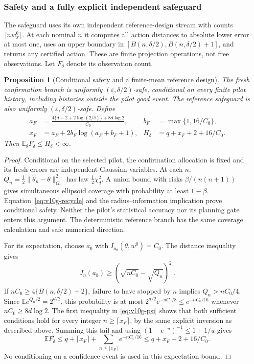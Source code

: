 \documentclass{article}
\theoremstyle{plain}
\newtheorem{proposition}[theorem]{Proposition}
\theoremstyle{definition}
\begin{document}
\subsubsection{Safety and a fully explicit independent safeguard}

The safeguard uses its own independent reference-design stream with
counts $\lceil nw_x^0\rceil$.  At each nominal $n$ it computes all
action distances to absolute lower error at most one, uses an upper
boundary in $[B(n,\delta/2),B(n,\delta/2)+1]$, and returns any
certified action.  These are finite projection operations,
not free observations.  Let $F_\delta$ denote its observation count.

\begin{proposition}[Conditional safety and a finite-mean reference design]
\label{prop:v10g-safety-fallback}
The fresh confirmation branch is uniformly $(\varepsilon,\delta/2)$-safe,
conditional on every finite pilot history, including histories outside
the pilot good event.  The reference safeguard is also uniformly
$(\varepsilon,\delta/2)$-safe.  Define
\begin{align}
 a_F&=\frac{4\{d+2+2\log(2/\delta)\}+8d\log2}{C_0},
 &b_F&=\max\{1,16/C_0\},\nonumber\\
 x_F&=a_F+2b_F\log(a_F+b_F+1),
 &H_\delta&=q+x_F+2+16/C_0.
 \label{eq:v10g-fallback-budget}
\end{align}
Then $\mathbb E_\theta F_\delta\le H_\delta<\infty$.
\end{proposition}
\begin{proof}
Conditional on the selected pilot, the confirmation allocation is fixed
and its fresh errors are independent Gaussian variables.  At each $n$,
$Q_n=\tfrac12\|\widehat\theta_n-\theta\|_{G_n}^2$ has law
$\tfrac12\chi_d^2$.  A union bound with risks
$\beta/(n(n+1))$ gives simultaneous ellipsoid coverage with probability
at least $1-\beta$.  Equation~\eqref{eq:v10g-recycle} and the radius--information implication prove conditional safety.  Neither
the pilot's statistical accuracy nor its planning gate enters this
argument.  The deterministic reference branch has the same coverage
calculation and safe numerical direction.

For its expectation, choose $a_0$ with $I_{a_0}(\theta,w^0)=C_0$.
The distance inequality gives
\[
 J_n(a_0)\ge(\sqrt{nC_0}-\sqrt{Q_n})_+^2.
\]
If $nC_0\ge4\{B(n,\delta/2)+2\}$, failure to have stopped by $n$
implies $Q_n>nC_0/4$.  Since
$\mathbb E e^{Q_n/2}=2^{d/2}$, this probability is at most
$2^{d/2}e^{-nC_0/8}\le e^{-nC_0/16}$ whenever
$nC_0\ge8d\log2$.
The first inequality in \eqref{eq:v10g-psi} shows that both sufficient
conditions hold for every integer $n\ge\lceil x_F\rceil$, by the
same explicit inversion as described above.  Summing this tail and using
$(1-e^{-u})^{-1}\le1+1/u$ gives
\[
 \mathbb EF_\delta
 \le q+\lceil x_F\rceil+\sum_{n\ge\lceil x_F\rceil}e^{-nC_0/16}
 \le q+x_F+2+16/C_0.
\]
No conditioning on a confidence event is used in this expectation bound.
\end{proof}
\end{document}
